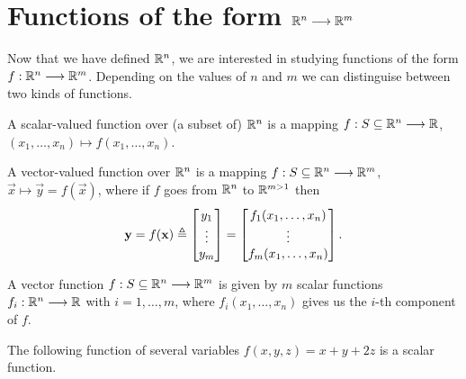 
\section{Functions of the form $\Rtn\longrightarrow\R^m$}
Now that we have defined $\Rtn$, we are interested in studying functions of the form $\stdvf$. Depending on the values of 
$n$ and $m$ we can distinguise between two kinds of functions.

\begin{defn}\label{def:scalar-function}
	A scalar-valued function over (a subset of) $\Rtn$ is a mapping $\appl{f}{S\subseteq\Rtn}{\R}$, $\left(x_1, \ldots, x_n\right)
	\longmapsto f\left(x_1, \ldots, x_n\right)$.
\end{defn}

\begin{defn}
	A vector-valued function over $\Rtn$ is a mapping $\appl{f}{S\subseteq\Rtn}{\R^m}$, $\vec{x}\longmapsto\vec{y} = f(\vec{x})$, where
	if $f$ goes from $\Rtn$ to $\R^{m>1}$ then
	\begin{equation}
		\mathbf{y} = f(\mathbf{x})\triangleq\begin{bmatrix}y_1 \\ \vdots \\ y_m \end{bmatrix} = \begin{bmatrix}f_1(x_1, \ldots, x_n) \\
		\vdots \\ f_m(x_1, \ldots, x_n)\end{bmatrix}.
	\end{equation}
\end{defn}

\begin{remark}
	A vector function $\appl{f}{S\subseteq\Rtn}{\R^m}$ is given by $m$ scalar functions $\appl{f_i}{\Rtn}{\R}$ with $i = 1, \ldots,
	m$, where $f_i(x_1, \ldots, x_n)$ gives us the $i$-th component of $f$.
\end{remark}

\begin{example}
    The following function of several variables $f(x, y, z) = x + y + 2z$ is a scalar function.
\end{example}

